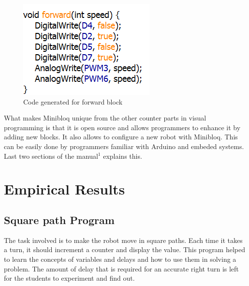 \documentclass[conference]{IEEEtran}
\begin{document}
\begin{figure}[h]
\centering
\includegraphics[scale=0.4]{Fig_12.png}
\caption{Code generated for forward block}
\end{figure}

What makes Minibloq unique from the other counter parts in visual programming is that it is open source and allows programmers to enhance it by adding new blocks. It also allows to configure a new robot with Minibloq. This can be easily done by programmers familiar with Arduino and embeded systems. Last two sections of the manual$^1$ explains this.

\section{Empirical Results}

\subsection{Square path Program}

The task involved is to make the robot move in square paths. Each time it takes a turn, it should increment a counter and display the value. This program helped to learn the concepts of variables and delays and how to use them in solving a problem. The amount of delay that is required for an accurate right turn is left for the students to experiment and find out.
\end{document}
